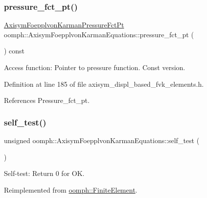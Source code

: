 \subsubsection{\texorpdfstring{pressure\+\_\+fct\+\_\+pt()}{pressure\_fct\_pt()}\hspace{0.1cm}{\footnotesize\ttfamily [4/4]}}
{\footnotesize\ttfamily \hyperlink{classoomph_1_1AxisymFoepplvonKarmanEquations_a504878b18d793ef8a6540eb0f2b086c8}{Axisym\+Foepplvon\+Karman\+Pressure\+Fct\+Pt} oomph\+::\+Axisym\+Foepplvon\+Karman\+Equations\+::pressure\+\_\+fct\+\_\+pt (\begin{DoxyParamCaption}{ }\end{DoxyParamCaption}) const\hspace{0.3cm}{\ttfamily [inline]}}



Access function\+: Pointer to pressure function. Const version. 



Definition at line 185 of file axisym\+\_\+displ\+\_\+based\+\_\+fvk\+\_\+elements.\+h.



References Pressure\+\_\+fct\+\_\+pt.

\mbox{\label{classoomph_1_1AxisymFoepplvonKarmanEquations_a2ececacf1a7dd89188a4a20e5abbb7c0}} 
\subsubsection{\texorpdfstring{self\+\_\+test()}{self\_test()}\hspace{0.1cm}{\footnotesize\ttfamily [1/2]}}
{\footnotesize\ttfamily unsigned oomph\+::\+Axisym\+Foepplvon\+Karman\+Equations\+::self\+\_\+test (\begin{DoxyParamCaption}{ }\end{DoxyParamCaption})\hspace{0.3cm}{\ttfamily [virtual]}}



Self-\/test\+: Return 0 for OK. 



Reimplemented from \hyperlink{classoomph_1_1FiniteElement_af94c5a5e22175d5420b33b3b79e46ed3}{oomph\+::\+Finite\+Element}.

